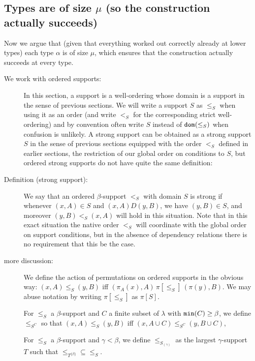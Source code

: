 \documentclass[112pt]{article}
\begin{document}
\newpage
\subsection{Types are of size $\mu$ (so the construction actually succeeds)}

Now we argue that (given that everything worked out correctly already at lower types) each type $\alpha$ is of size $\mu$, which ensures
that the construction actually succeeds at every type.

\begin{description}

\item[We work with ordered supports:]  In this section, a support is a well-ordering whose domain is a support in the sense of previous sections.  We will write a support $S$ as $\leq_S$ when using it as an order (and write $<_S$ for the corresponding strict well-ordering) and by convention often write
$S$ instead of ${\tt dom}(\leq_S)$ when confusion is unlikely.  A strong support can be obtained as a strong support $S$ in the sense of previous sections equipped with the order $<_S$ defined in earlier sections, the restriction of our global order on conditions to $S$, but ordered strong supports do not have quite the same definition:

\item[Definition (strong support):]  We say that an ordered $\beta$-support $<_S$ with domain $S$  is strong if whenever $(x,A) \in S$ and $(x,A) D (y,B)$, we have $(y,B)\in S$, and moreover $(y,B) <_S (x,A)$ will hold in this situation.  Note that in this exact situation the native order $<_S$ will coordinate with the global order on support conditions, but in the absence of dependency relations there is no requirement that this be the case.

\item[more discussion:]   We define the action of permutations
on ordered supports in the obvious way:  $(x,A) \leq_S (y,B)$ iff $(\pi_A(x),A)\, \pi[\leq_S]\, (\pi(y),B)$.  We may abuse notation by writing $\pi[\leq_S]$ as $\pi[S]$.

For $\leq_S$ a $\beta$-support and $C$ a finite subset of $\lambda$ with ${\tt min}(C) \geq \beta$, we define $\leq_{S^C}$ so that $(x,A) \leq_S (y,B)$ iff $(x,A \cup C) \leq_{S^C} (y,B \cup C)$,

For $\leq_S$ a $\beta$-support and $\gamma<\beta$, we define $\leq_{S_{(\gamma)}}$ as the largest $\gamma$-support $T$ such that $\leq_{T^{\{\beta\}}} \subseteq \leq_S$.


\end{description}
\end{document}
